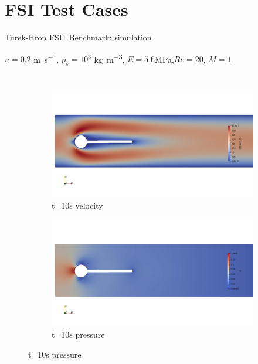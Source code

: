 \documentclass[10pt,t]{beamer}
\begin{document}
\section{FSI Test Cases}

\begin{frame}{Turek-Hron FSI1 Benchmark: simulation}

$u=0.2$ \si{m.s^{-1}}, $\rho_s=10^3$ \si{kg.m^{-3}}, $E= 5.6$\si{MPa},$Re=20$, $M=1$

\begin{columns}


\vspace{0.5cm}

\begin{figure}
    \centering
    \begin{subfigure}{0.95\textwidth}
    
    \includegraphics[width=\linewidth, trim=0 200 0 120, clip]{images/FSI1/FSI1_vel.png}
    \caption{t=10s velocity}
    \end{subfigure}\hfil
    
    \medskip
    
    \begin{subfigure}{0.95\textwidth}
    
    \includegraphics[width=\linewidth, trim=0 200 0 120, clip]{images/FSI1/FSI1_p.png}
    \caption{t=10s pressure}  
    \end{subfigure}\hfil
    

\end{figure}
\end{columns}
\end{frame}
\end{document}
